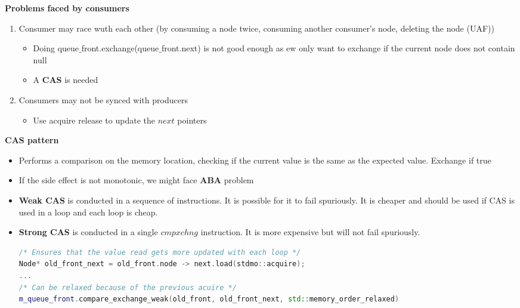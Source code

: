 \documentclass[10pt, landscape]{article}
\begin{document}
\begin{multicols}{4}
\textbf{Problems faced by consumers} \\
\begin{enumerate}
    \item Consumer may race wuth each other (by consuming a node twice, consuming another consumer's node, deleting the node (UAF))
    \begin{itemize}
        \item Doing queue$\_$front.exchange(queue$\_$front.next) is not good enough as ew only want to exchange if the current node does not contain null 
        \item A \textbf{CAS} is needed
    \end{itemize}
    \item Consumers may not be synced with producers 
    \begin{itemize}
        \item Use acquire release to update the $next$ pointers
    \end{itemize}
\end{enumerate}

\textbf{CAS pattern} \\
\begin{itemize}
    \item Performs a comparison on the memory location, checking if the current value is the same as the expected value. Exchange if true
    \item If the side effect is not monotonic, we might face \textbf{ABA} problem
    \item \textbf{Weak CAS} is conducted in a sequence of instructions. It is possible for it to fail spuriously. It is cheaper and should be used if CAS is used in a loop and each loop is cheap.
    \item \textbf{Strong CAS} is conducted in a single $cmpxchng$ instruction. It is more expensive but will not fail spuriously.
    \begin{lstlisting}[language=C++, breaklines=true, breakatwhitespace=true]
/* Ensures that the value read gets more updated with each loop */
Node* old_front_next = old_front.node -> next.load(stdmo::acquire);
... 
/* Can be relaxed because of the previous acuire */
m_queue_front.compare_exchange_weak(old_front, old_front_next, std::memory_order_relaxed)
    \end{lstlisting}
\end{itemize}


\end{multicols}
\end{document}
